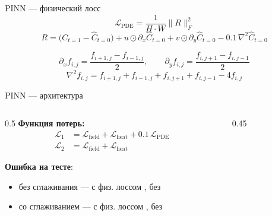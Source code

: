 \documentclass[aspectratio=169]{beamer}
\begin{document}
\begin{frame}{PINN --- физический лосс}
  \[ \mathcal{L}_{\text{PDE}} = \frac{1}{H \cdot W} \lVert R \rVert_F^2 \]
  \vspace{-0.7em}
  \[ R = \big(C_{t=1} - \hat{C}_{t=0}\big) + u \odot \partial_x \hat{C}_{t=0}
       + v \odot \partial_y \hat{C}_{t=0} - 0.1\,\nabla^2 \hat{C}_{t=0} \]

  \vspace{0.2em}
  \[ \partial_x f_{i, j} = \frac{f_{i+1,j} - f_{i-1,j}}{2}, \qquad
     \partial_y f_{i, j} = \frac{f_{i,j+1} - f_{i,j-1}}{2} \]
  \vspace{-0.6em}
  \[ \nabla^2 f_{i, j} = f_{i+1,j} + f_{i-1,j} + f_{i,j+1} + f_{i,j-1} - 4 f_{i,j} \]
\end{frame}

\begin{frame}{PINN --- архитектура}
  \begin{columns}[T,onlytextwidth]
    \begin{column}{0.5\textwidth}
      \textbf{Функция потерь:}
      \[ \begin{aligned}
        \mathcal{L}_1 &= \mathcal{L}_{\text{field}} + \mathcal{L}_{\text{heat}} + 0.1\,\mathcal{L}_{\text{PDE}}\\
        \mathcal{L}_2 &= \mathcal{L}_{\text{field}} + \mathcal{L}_{\text{heat}}
      \end{aligned} \]

      \vspace{0.4em}
      \textbf{Ошибка на тесте}:
      \begin{itemize}
        \item без сглаживания --- с физ. лоссом \textbf{\mPinnMean}, без \textbf{\mPinnNoPdeMean}
        \item со сглаживанием --- с физ. лоссом \textbf{\mPinnSmooth}, без \textbf{\mPinnNoPdeSmooth}
      \end{itemize}

    \end{column}
    \begin{column}{0.45\textwidth}
      \centering
    \end{column}
  \end{columns}
\end{frame}
\end{document}
